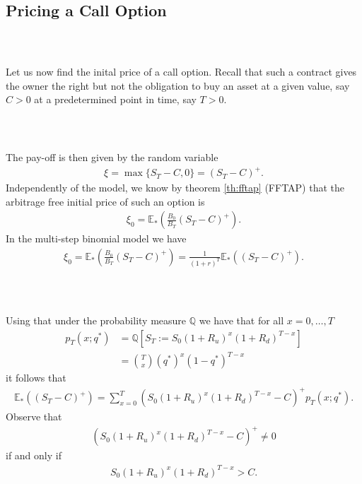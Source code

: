 \documentclass{beamer}
\numberwithin{equation}{section}
\begin{document}
\subsection{Pricing a Call Option}

\begin{frame}\frametitle{{\normalsize \secname} \\ {\large \subsecname}}
    Let us now find the inital price of a call option.
    Recall that such a contract gives the owner the right but not the obligation to buy an asset at a given value, say $C > 0$ at a predetermined point in time, say $T > 0$.
\end{frame}

\begin{frame}\frametitle{{\normalsize \secname} \\ {\large \subsecname}}
    The pay-off is then given by the random variable
    \begin{align}
        \xi = \max\{ S_T - C, 0\} = (S_T - C)^+.
    \end{align}
    Independently of the model, we know by theorem \ref{th:fftap} (FFTAP) that the arbitrage free initial price of such an option is
    \begin{align}
        \xi_0 = \mathbb{E}_*\left( \frac{B_0}{B_T}(S_T - C)^+\right).
    \end{align}
    In the multi-step binomial model we have
    \begin{align}
        \xi_0 = \mathbb{E}_* \left( \frac{B_0}{B_T}(S_T - C)^+ \right) = \frac{1}{(1+r)^T} \mathbb{E}_* \left( (S_T-C)^+\right).
    \end{align}
\end{frame}

\begin{frame}\frametitle{{\normalsize \secname} \\ {\large \subsecname}}
    Using that under the probability measure $\mathbb{Q}$ we have that for all $x = 0, \ldots, T$
    \begin{align}
        p_T(x; q^*) &= \mathbb{Q}\left[ S_T := S_0(1+ R_u)^x(1+R_d)^{T-x}\right]\\
        &= \binom{T}{x}( q^* )^x(1-q^*)^{T-x}
    \end{align}
    it follows that
    \begingroup
    \footnotesize
    \begin{align}
        \mathbb{E}_* \left( (S_T - C)^+ \right) = \sum_{x=0}^T \left( S_0(1+R_u)^x(1+R_d)^{T-x} - C \right)^+ p_T(x; q^*).
    \end{align}
    \endgroup
    Observe that
    \begin{align}
        \left( S_0(1+R_u)^x(1+R_d)^{T-x} - C \right)^+ \neq 0
    \end{align}
    if and only if
    \begin{align}
        S_0(1+R_u)^x(1+R_d)^{T-x} > C.
    \end{align}
\end{frame}
\end{document}
